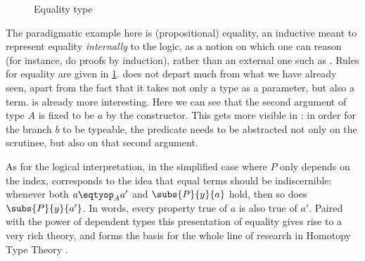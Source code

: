 \begin{figure}
  \AP
  \caption{Equality type}
  \label{fig:eq-type}
\end{figure}

The paradigmatic example here is (propositional) equality, an
inductive meant to represent equality \emph{internally} to the logic, \ie as a notion on
which one can reason (for instance, do proofs by induction), rather than an external one
such as .
Rules for equality are given in \cref{fig:eq-type}.  does not depart
much from what we have already seen,
apart from the fact that it takes not only a type as a parameter, but
also a term.  is already more interesting. Here we can see that
the second argument of type $A$ is fixed to be $a$ by the constructor. This gets
more visible in : in order for the branch $b$
to be typeable, the predicate needs to be abstracted not only on the scrutinee,
but also on that second argument.

As for the logical interpretation, in the simplified case where $P$ only depends on the index,
 corresponds to the idea that equal terms should be indiscernible:
whenever both $\eqty[A]{a}{a'}$ and $\subs{P}{y}{a}$ hold, then so does $\subs{P}{y}{a'}$.
In words, every property true of $a$ is also true of $a'$. Paired with the power of
dependent types this presentation of equality gives rise to a very rich theory, and
forms the basis for the whole line of research in Homotopy Type Theory .

